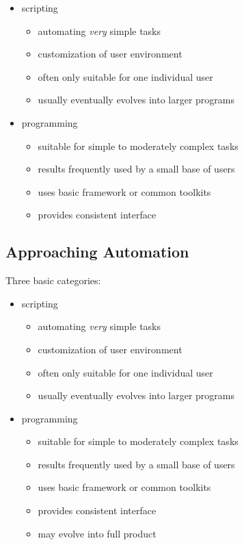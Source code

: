 \documentclass[xga]{xdvislides}
\begin{document}
\begin{itemize}
	\item scripting
		\begin{itemize}
			\item automating {\em very} simple tasks
			\item customization of user environment
			\item often only suitable for one individual user
			\item usually eventually evolves into larger programs
		\end{itemize}
	\item programming
		\begin{itemize}
			\item suitable for simple to moderately complex tasks
			\item results frequently used by a small base of users
			\item uses basic framework or common toolkits
			\item provides consistent interface
		\end{itemize}
\end{itemize}

\subsection{Approaching Automation}
Three basic categories:
\\

\begin{itemize}
	\item scripting
		\begin{itemize}
			\item automating {\em very} simple tasks
			\item customization of user environment
			\item often only suitable for one individual user
			\item usually eventually evolves into larger programs
		\end{itemize}
	\item programming
		\begin{itemize}
			\item suitable for simple to moderately complex tasks
			\item results frequently used by a small base of users
			\item uses basic framework or common toolkits
			\item provides consistent interface
			\item may evolve into full product
		\end{itemize}
\end{itemize}
\end{document}
